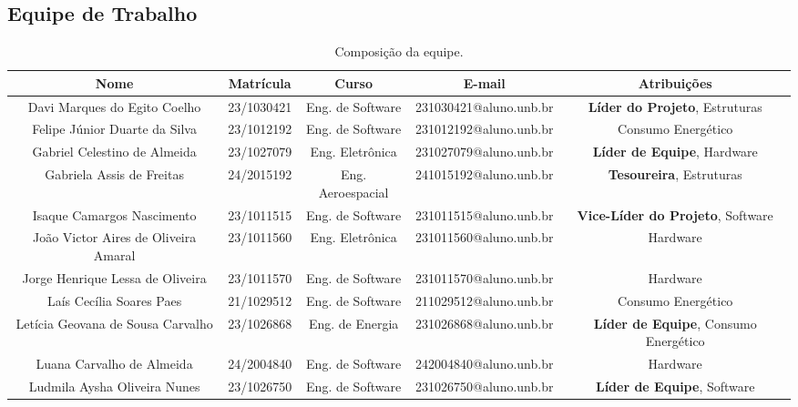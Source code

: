 \begin{landscape}

\chapter{Equipe de Trabalho}

\begin{table}[htpb]
\footnotesize
\begin{center}
\caption{Composição da equipe.}
\begin{tabular}{|c|c|c|c|c|}
\hline
\textbf{Nome} & \textbf{Matrícula} & \textbf{Curso} & \textbf{E-mail} & \textbf{Atribuições}\\ \hline

Davi Marques do Egito Coelho      & 23/1030421        & Eng. de Software       & 231030421@aluno.unb.br & \textbf{Líder do Projeto}, Estruturas \\ \hline
Felipe Júnior Duarte da Silva    & 23/1012192        & Eng. de Software      & 231012192@aluno.unb.br & Consumo Energético \\ \hline
Gabriel Celestino de Almeida      & 23/1027079        & Eng. Eletrônica       & 231027079@aluno.unb.br & \textbf{Líder de Equipe}, Hardware\\\hline
Gabriela Assis de Freitas      & 24/2015192        & Eng. Aeroespacial       & 241015192@aluno.unb.br & \textbf{Tesoureira}, Estruturas \\ \hline
Isaque Camargos Nascimento     & 23/1011515       & Eng. de Software       & 231011515@aluno.unb.br & \textbf{Vice-Líder do Projeto}, Software\\\hline
João Victor Aires de Oliveira Amaral     & 23/1011560        & Eng. Eletrônica      & 231011560@aluno.unb.br & Hardware \\ \hline
Jorge Henrique Lessa de Oliveira     & 23/1011570       & Eng. de Software      & 231011570@aluno.unb.br & Hardware \\ \hline
Laís Cecília Soares Paes     & 21/1029512        & Eng. de Software       & 211029512@aluno.unb.br & Consumo Energético \\ \hline
Letícia Geovana de Sousa Carvalho      & 23/1026868        & Eng. de Energia       & 231026868@aluno.unb.br &  \textbf{Líder de Equipe}, Consumo Energético\\ \hline
Luana Carvalho de Almeida     & 24/2004840        & Eng. de Software       & 242004840@aluno.unb.br & Hardware \\ \hline
Ludmila Aysha Oliveira Nunes     & 23/1026750        & Eng. de Software       & 231026750@aluno.unb.br & \textbf{Líder de Equipe}, Software\\ \hline

\end{tabular}
\end{center}
\end{table}
\end{landscape}
